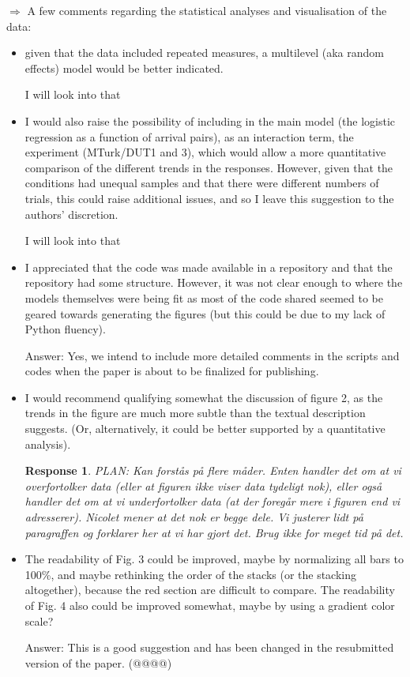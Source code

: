 \documentclass[a4paper]{article}
\newtheorem{response}{Response}
\newenvironment{robin}{\smallskip \noindent \color{red!10!green!50!blue}}{\color{black}\smallskip}
\begin{document}
$\Rightarrow$ A few comments regarding the statistical analyses and visualisation of the data:
\begin{itemize}
\item given that the data included repeated measures, a multilevel (aka random effects) model would be better indicated. 

\begin{robin} I will look into that \end{robin}
\item I would also raise the possibility of including in the main model (the logistic regression as a function of arrival pairs), as an interaction term, the experiment (MTurk/DUT1 and 3), which would allow a more quantitative comparison of the different trends in the responses. However, given that the conditions had unequal samples and that there were different numbers of trials, this could raise additional issues, and so I leave this suggestion to the authors' discretion. 

\begin{robin} I will look into that \end{robin}
\item I appreciated that the code was made available in a repository and that the repository had some structure. However, it was not clear enough to where the models themselves were being fit as most of the code shared seemed to be geared towards generating the figures (but this could be due to my lack of Python fluency). 

\begin{robin}Answer: Yes, we intend to include more detailed comments in the scripts and codes when the paper is about to be finalized for publishing. \end{robin}
\item I would recommend qualifying somewhat the discussion of figure 2, as the trends in the figure are much more subtle than the textual description suggests. (Or, alternatively, it could be better supported by a quantitative analysis).

\begin{response}
PLAN: Kan forstås på flere måder. Enten handler det om at vi overfortolker data (eller at figuren ikke viser data tydeligt nok), eller også handler det om at vi underfortolker data (at der foregår mere i figuren end vi adresserer). Nicolet mener at det nok er begge dele. Vi justerer lidt på paragraffen og forklarer her at vi har gjort det. Brug ikke for meget tid på det. 
\end{response}

\item The readability of Fig. 3 could be improved, maybe by normalizing all bars to 100\%, and maybe rethinking the order of the stacks (or the stacking altogether), because the red section are difficult to compare. The readability of Fig. 4 also could be improved somewhat, maybe by using a gradient color scale?

\begin{robin}Answer: This is a good suggestion and has been changed in the resubmitted version of the paper. (@@@@) \end{robin}
\end{itemize}
\end{document}
